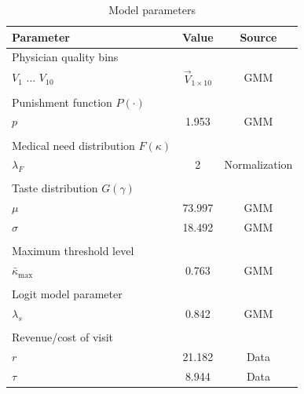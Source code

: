 \documentclass[../main.tex]{subfiles}
\begin{document}
\begin{table}[h]
    \centering
    \small
    \begin{tabular}{lcc}
        \toprule
        Parameter  & Value & Source \\
        \midrule
        Physician quality bins && \\
        \hspace{1em}$V_1$ ... $V_{10}$ & $\vec{V}_{1 \times 10}$ & GMM \\
            \\
        Punishment function $P(\cdot)$ && \\
            \hspace{1em}$p$ & 1.953 &  GMM\\
            \\
        Medical need distribution $F(\kappa)$ && \\
            \hspace{1em}$\lambda_F$ & 2 & \hspace{0.25em} Normalization\\
            \\
        Taste distribution $G(\gamma)$ \\
            \hspace{1em}$\mu$ & 73.997 &  GMM\\
            \hspace{1em}$\sigma$ & 18.492 &  GMM\\
            \\
        Maximum threshold level && \\
            \hspace{1em}$\bar{\kappa}_{\max}$ & 0.763 &  GMM\\
            \\
        Logit model parameter && \\
            \hspace{1em}$\lambda_s$ & 0.842 & GMM\\
            \\
        Revenue/cost of visit && \\
            \hspace{1em}$r$ & 21.182 & Data \\
            \hspace{1em}$\tau$ & 8.944 & Data \\
        \bottomrule 
    \end{tabular}
    \caption{Model parameters}
\end{table}
\end{document}
